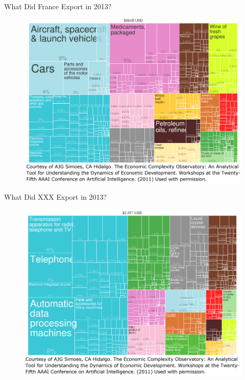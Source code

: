 \documentclass[10pt,hyperref={CJKbookmarks=true},xcolor=dvipsnames,aspectratio=169]{beamer}
\begin{document}
\begin{frame}{What Did France Export in 2013?}


\begin{figure}
\includegraphics[scale=0.35]{fig/gravity/com2-2.PNG}
\end{figure}

\end{frame}

\begin{frame}{What Did XXX Export in 2013?}


\begin{figure}
\includegraphics[scale=0.35]{fig/gravity/com2-3.PNG}
\end{figure}

\end{frame}
\end{document}
